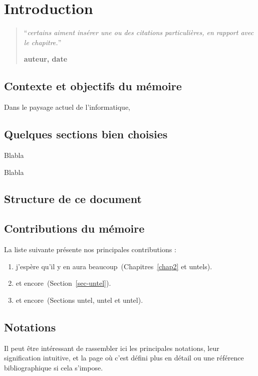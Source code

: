 
\chapter{Introduction}
\setcounter{page}{1}
\begin{quotation}
	\noindent ``\emph{certains aiment insérer une ou des citations particulières, en rapport avec le chapitre.}''
	\begin{flushright}\textbf{auteur, date}\end{flushright}
\end{quotation}

\vspace*{0.5cm}

\section{Contexte et objectifs du mémoire}
%
%

Dans le paysage actuel de l'informatique, 

\section{Quelques sections bien choisies}
Blabla

Blabla
\section{Structure de ce document}

\section{Contributions du mémoire}
\noindent
La liste suivante présente nos principales contributions :
\vspace{1cm}
\begin{enumerate}
	\item j'espère qu'il y en aura beaucoup~(Chapitres~\ref{chap2} et untels).
	\item et encore~(Section~\ref{sec-untel}).
	\item et encore~(Sections untel, untel et untel).
\end{enumerate}

\clearpage
\section{Notations}

%
Il peut être intéressant de rassembler ici les principales notations, leur signification intuitive, et la page où c'est défini plus en détail ou une référence bibliographique si cela s'impose.
